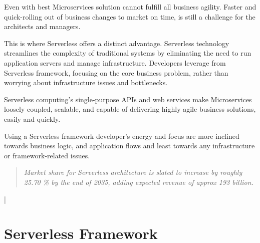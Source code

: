 \documentclass[12pt]{article}
\begin{document}
\begin{flushleft}
Even with best Microservices solution cannot fulfill all business agility. Faster and quick-rolling out of business changes to market on time, is still a challenge for the architects and managers. 

This is where Serverless offers a distinct advantage. Serverless technology streamlines the complexity of traditional systems by eliminating the need to run application servers and manage infrastructure. Developers leverage from Serverless framework, focusing on the core business problem, rather than worrying about infrastructure issues and bottlenecks.

Serverless computing's single-purpose APIs and web services make Microservices loosely coupled, scalable, and capable of delivering highly agile business solutions, easily and quickly.

Using a Serverless framework developer’s energy and focus are more inclined towards business logic, and application flows and least towards any infrastructure or framework-related issues.

\begin{quote}
   \textit{Market share for Serverless architecture is slated to increase by roughly 25.70 \% by the end of 2035, adding expected revenue of approx 193 billion. }
\end{quote}
\cite{Global_Market_Insights_ID_GMI3796_2022}|
\end{flushleft}
\pagebreak

\section{Serverless Framework}
\end{document}
